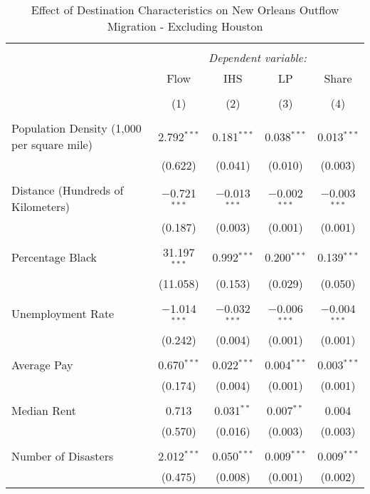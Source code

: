 \documentclass[]{article}
\begin{document}
\begin{table}[!htbp] \centering 
  \caption{\label{reg:regnoho}Effect of Destination Characteristics on New Orleans Outflow Migration - Excluding Houston} 
  \label{} 
\scriptsize 
\begin{tabular}{@{\extracolsep{5pt}}lcccc} 
\\[-1.8ex]\hline 
\hline \\[-1.8ex] 
 & \multicolumn{4}{c}{\textit{Dependent variable:}} \\ 
\cline{2-5} 
 & Flow & IHS & LP & Share \\ 
\\[-1.8ex] & (1) & (2) & (3) & (4)\\ 
\hline \\[-1.8ex] 
 Population Density (1,000 per square mile) & 2.792$^{***}$ & 0.181$^{***}$ & 0.038$^{***}$ & 0.013$^{***}$ \\ 
  & (0.622) & (0.041) & (0.010) & (0.003) \\ 
  & & & & \\ 
 Distance (Hundreds of Kilometers) & $-$0.721$^{***}$ & $-$0.013$^{***}$ & $-$0.002$^{***}$ & $-$0.003$^{***}$ \\ 
  & (0.187) & (0.003) & (0.001) & (0.001) \\ 
  & & & & \\ 
 Percentage Black & 31.197$^{***}$ & 0.992$^{***}$ & 0.200$^{***}$ & 0.139$^{***}$ \\ 
  & (11.058) & (0.153) & (0.029) & (0.050) \\ 
  & & & & \\ 
 Unemployment Rate & $-$1.014$^{***}$ & $-$0.032$^{***}$ & $-$0.006$^{***}$ & $-$0.004$^{***}$ \\ 
  & (0.242) & (0.004) & (0.001) & (0.001) \\ 
  & & & & \\ 
 Average Pay & 0.670$^{***}$ & 0.022$^{***}$ & 0.004$^{***}$ & 0.003$^{***}$ \\ 
  & (0.174) & (0.004) & (0.001) & (0.001) \\ 
  & & & & \\ 
 Median Rent & 0.713 & 0.031$^{**}$ & 0.007$^{**}$ & 0.004 \\ 
  & (0.570) & (0.016) & (0.003) & (0.003) \\ 
  & & & & \\ 
 Number of Disasters & 2.012$^{***}$ & 0.050$^{***}$ & 0.009$^{***}$ & 0.009$^{***}$ \\ 
  & (0.475) & (0.008) & (0.001) & (0.002) \\ 

\end{tabular}
\end{table}
\end{document}
